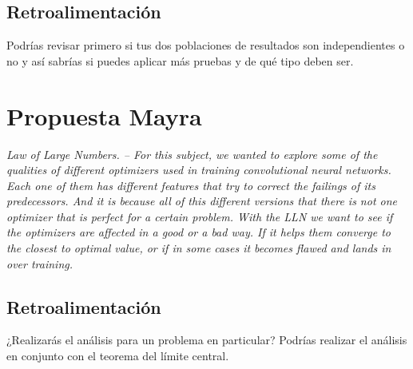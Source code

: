 \documentclass[12pt]{article}
\begin{document}
\subsection{Retroalimentación}

Podrías revisar primero si tus dos poblaciones de resultados son independientes o no y así sabrías si puedes aplicar más pruebas y de qué tipo deben ser.

\section{Propuesta Mayra}
{\em Law of Large Numbers. -- For this subject, we wanted to explore some of the qualities of different optimizers used in training convolutional neural networks. Each one of them has different features that try to correct the failings of its predecessors. And it is because all of this different versions that there is not one optimizer that is perfect for a certain problem. With the LLN we want to see if the optimizers are affected in a good or a bad way. If it helps them converge to the closest to optimal value, or if in some cases it becomes flawed and lands in over training.}

\subsection{Retroalimentación}

¿Realizarás el análisis para un problema en particular? Podrías realizar el análisis en conjunto con el teorema del límite central.

	
%
%
\end{document}
